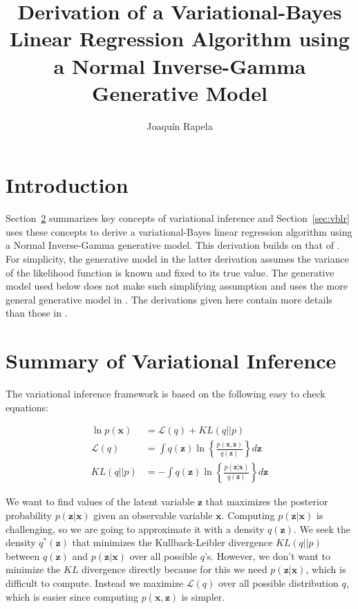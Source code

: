 \documentclass[12pt]{article}
\title{Derivation of a Variational-Bayes Linear Regression Algorithm using a
Normal Inverse-Gamma Generative Model}
\author{Joaqu\'{i}n Rapela}
\begin{document}
\maketitle


\section{Introduction}

Section~\ref{sec:variationalInference} summarizes key concepts of variational
inference and Section~\ref{sec:vblr} uses these concepts to derive a
variational-Bayes linear regression algorithm using a Normal Inverse-Gamma
generative model. This derivation builds on that of
\citet[][Chapter~10]{bishop06}.  For simplicity, the generative model in the
latter derivation assumes the variance of the likelihood function is known and
fixed to its true value. The generative model used below does not make such
simplifying assumption and uses the more general generative model in
\citet{drugowitsch14}. The derivations given here contain more details than
those in \citet{drugowitsch14}.

\section{Summary of Variational Inference}
\label{sec:variationalInference}

The variational inference framework is based on the following easy to check
equations:

\begin{align}
\ln p(\mathbf{x})&=\mathcal{L}(q)+KL(q||p)\nonumber\\
\mathcal{L}(q)&=\int
q(\mathbf{z})\ln\left\{\frac{p(\mathbf{x},\mathbf{z})}{q(\mathbf{z})}\right\}d\mathbf{z}\nonumber\\
KL(q||p)&=-\int
q(\mathbf{z})\ln\left\{\frac{p(\mathbf{z}|\mathbf{x})}{q(\mathbf{z})}\right\}d\mathbf{z}\nonumber
\end{align}

We want to find values of the latent variable $\mathbf{z}$ that maximizes the
posterior probability $p(\mathbf{z}|\mathbf{x})$ given an observable variable
$\mathbf{x}$.
%
Computing $p(\mathbf{z}|\mathbf{x})$ is challenging, so we are going to
approximate it with a density $q(\mathbf{z})$. We seek the density
$q^*(\mathbf{z})$ that minimizes the Kullback-Leibler divergence $KL(q||p)$
between $q(\mathbf{z})$ and $p(\mathbf{z}|\mathbf{x})$ over all possible $q$'s.
However, we don't want to minimize the $KL$ divergence directly because for
this we need $p(\mathbf{z}|\mathbf{x})$, which is difficult to compute. Instead
we maximize $\mathcal{L}(q)$ over all possible distribution $q$, which is
easier since computing $p(\mathbf{x},\mathbf{z})$ is simpler. 
\end{document}
